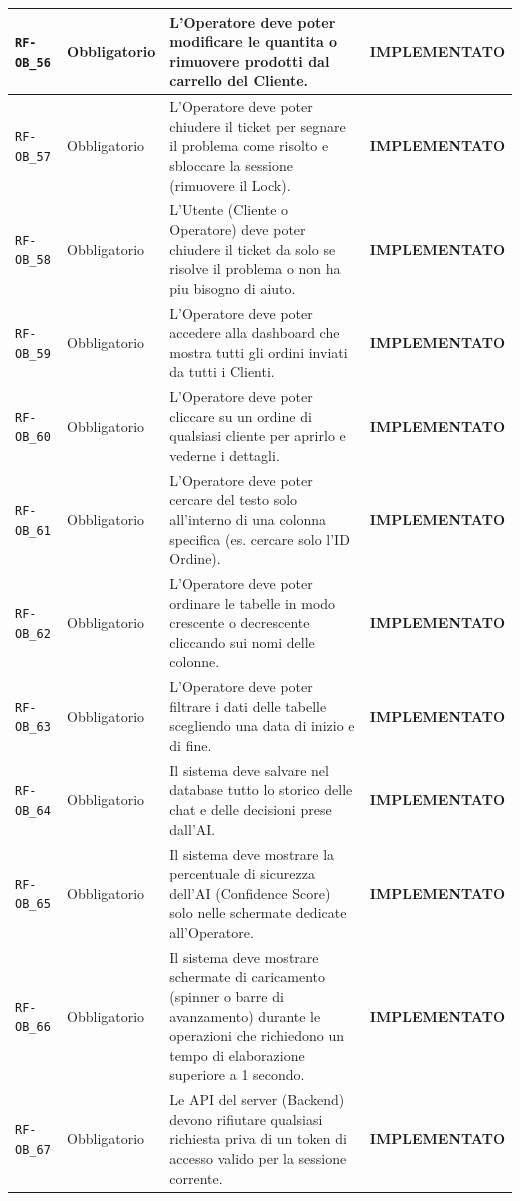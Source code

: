\documentclass[a4paper, 11pt, oneside]{scrartcl}
\begin{document}
\begin{longtable}{|>{\raggedright\arraybackslash}p{}|>{\raggedright\arraybackslash}p{}|>{\raggedright\arraybackslash}p{}|>{\raggedright\arraybackslash}p{}|}
    \hline
    \texttt{RF-OB\_56} & Obbligatorio & L'Operatore deve poter modificare le quantita o rimuovere prodotti dal carrello del Cliente. & \textbf{IMPLEMENTATO} \\
    \hline
    \texttt{RF-OB\_57} & Obbligatorio & L'Operatore deve poter chiudere il ticket per segnare il problema come risolto e sbloccare la sessione (rimuovere il Lock). & \textbf{IMPLEMENTATO} \\
    \hline
    \texttt{RF-OB\_58} & Obbligatorio & L'Utente (Cliente o Operatore) deve poter chiudere il ticket da solo se risolve il problema o non ha piu bisogno di aiuto. & \textbf{IMPLEMENTATO} \\
    \hline
    \texttt{RF-OB\_59} & Obbligatorio & L'Operatore deve poter accedere alla dashboard che mostra tutti gli ordini inviati da tutti i Clienti. & \textbf{IMPLEMENTATO} \\
    \hline
    \texttt{RF-OB\_60} & Obbligatorio & L'Operatore deve poter cliccare su un ordine di qualsiasi cliente per aprirlo e vederne i dettagli. & \textbf{IMPLEMENTATO} \\
    \hline
    \texttt{RF-OB\_61} & Obbligatorio & L'Operatore deve poter cercare del testo solo all'interno di una colonna specifica (es. cercare solo l'ID Ordine). & \textbf{IMPLEMENTATO} \\
    \hline
    \texttt{RF-OB\_62} & Obbligatorio & L'Operatore deve poter ordinare le tabelle in modo crescente o decrescente cliccando sui nomi delle colonne. & \textbf{IMPLEMENTATO} \\
    \hline
    \texttt{RF-OB\_63} & Obbligatorio & L'Operatore deve poter filtrare i dati delle tabelle scegliendo una data di inizio e di fine. & \textbf{IMPLEMENTATO} \\
    \hline
    \texttt{RF-OB\_64} & Obbligatorio & Il sistema deve salvare nel database tutto lo storico delle chat e delle decisioni prese dall'AI. & \textbf{IMPLEMENTATO} \\
    \hline
    \texttt{RF-OB\_65} & Obbligatorio & Il sistema deve mostrare la percentuale di sicurezza dell'AI (Confidence Score) solo nelle schermate dedicate all'Operatore. & \textbf{IMPLEMENTATO} \\
    \hline
    \texttt{RF-OB\_66} & Obbligatorio & Il sistema deve mostrare schermate di caricamento (spinner o barre di avanzamento) durante le operazioni che richiedono un tempo di elaborazione superiore a 1 secondo. & \textbf{IMPLEMENTATO} \\
    \hline
    \texttt{RF-OB\_67} & Obbligatorio & Le API del server (Backend) devono rifiutare qualsiasi richiesta priva di un token di accesso valido per la sessione corrente. & \textbf{IMPLEMENTATO} \\

\end{longtable}
\end{document}

